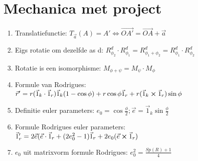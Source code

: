\documentclass[12pt]{article}
\begin{document}
    \maketitle

	\section{Mechanica met project}%
	\label{sec:Mechanica_met_project}

	\begin{enumerate}
		\item Translatiefunctie: $ T_{\vec{a}}(A) = A' \iff \vec{OA'} = \vec{OA} + \vec{a} $
		\item Eigs rotatie om dezelfde as d: $ R_{\phi_2}^d \cdot R_{\phi_1}^d = R_{\phi_1 + \phi_2}^d = R_{\phi_1}^d \cdot R_{\phi_2}^d $
		\item Rotatie is een isomorphisme: $ M_{\phi + \psi} = M_{\psi} \cdot M_{\phi} $
		\item Formule van Rodrigues: $ \vec{r}' = r(\vec{1}_k \cdot \vec{1}_r)\vec{1}_k (1 - \cos\phi) + r\cos\phi \vec{1}_r + r(\vec{1}_k \cross \vec{1}_r) \sin\phi $
		\item Definitie euler parameters: $ e_0 = \cos\frac{\phi}{2}; \vec{e} = \vec{1}_k \sin\frac{\phi}{2} $
		\item Formule Rodrigues euler parameters: $ \vec{1}_r' = 2\vec{e}(\vec{e}\cdot \vec{1}_r + (2e_0^2 - 1)\vec{1}_r + 2e_0(\vec{e}\cross \vec{1}_r) $
		\item $ e_0 $ uit matrixvorm formule Rodrigues: $ e_0^2 = \frac{Sp(R) + 1}{4} $
	\end{enumerate}
	
\end{document}
